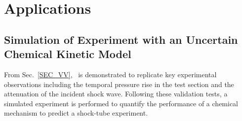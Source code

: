 \section{Applications}\label{SEC_APPLICATIONS}
\subsection{Simulation of Experiment with an Uncertain Chemical Kinetic Model}
From Sec.~\ref{SEC_VV}, \stnshk\ is demonstrated to replicate key experimental observations including the temporal pressure rise in the test section and the attenuation of the incident shock wave. Following these validation tests, a simulated experiment is performed to quantify the performance of a chemical mechanism to predict a shock-tube experiment. 

